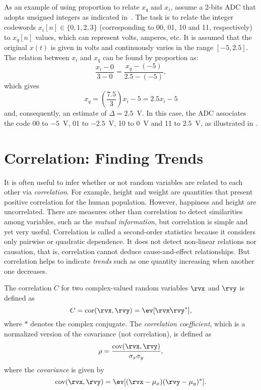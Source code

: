 As an example of using proportion to relate $x_q$ and $x_i$, assume a 2-bits ADC that adopts unsigned integers as indicated in~. The task is to relate the integer codewords $x_i[n] \in \{0,1,2, 3\}$ (corresponding to 00, 01, 10 and 11, respectively) to $x_q[n]$ values, which can represent volts, amperes, etc. It is assumed that the original $x(t)$ is given in volts and continuously varies in the range $[-5, 2.5]$.
The relation between $x_i$ and $x_q$ can be found by proportion as:
\[
\frac{x_i-0}{3-0} = \frac{x_q-(-5)}{2.5-(-5)},
\]
which gives
\[
x_q  = \left(\frac{7.5}{3}\right) x_i -5 = 2.5 x_i - 5
\]
and, consequently, an estimate of $\Delta=2.5$~V. In this case, the ADC associates the code 00 to $-5$~V, 01 to $-2.5$~V, 10 to $0$~V and 11 to $2.5$~V, as illustrated in .
\eExample 



\section{Correlation: Finding Trends}
\label{sec:correlation}

It is often useful to infer whether or not random variables are related to each other via \emph{correlation}. For example, height and weight are quantities that present positive correlation for the human population. However, happiness and height are uncorrelated. There are measures other than correlation to detect similarities among variables, such as the \emph{mutual information}, but correlation is simple and yet very useful. Correlation is called a second-order statistics because it considers only pairwise or quadratic dependence. It does not detect non-linear relations nor causation, that is, correlation cannot deduce cause-and-effect relationships. But correlation helps to indicate \emph{trends} such as one quantity increasing when another one decreases.

The correlation $C$ for two complex-valued random variables $\rvx$ and $\rvy$ is defined as 
\[
C = \textrm{cor}(\rvx,\rvy) =  \ev[\rvx \rvy^*],
\]
where $*$ denotes the complex conjugate.
The \emph{correlation coefficient}, which is a normalized version of the covariance (not correlation), is defined as
\[\rho = \frac{\textrm{cov}(\rvx,\rvy)}{\sigma_x \sigma_y},\]
where the \emph{covariance} is given by
\begin{equation}
\textrm{cov}(\rvx,\rvy) = \ev[ (\rvx - \mu_x) (\rvy - \mu_y)^*].
\label{eq:covarianceBetweenRVs}
\end{equation} 


